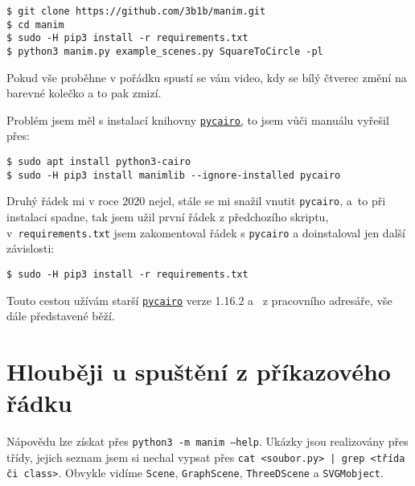 \begin{lstlisting}
$ git clone https://github.com/3b1b/manim.git
$ cd manim
$ sudo -H pip3 install -r requirements.txt
$ python3 manim.py example_scenes.py SquareToCircle -pl
\end{lstlisting}

\maldelka=21mm
\noindent
{}\hfill
{}\hfill
{}\hfill
{}\hfill
{}%


Pokud vše proběhne v pořádku spustí se vám video, kdy se bílý čtverec změní na barevné kolečko a to pak zmizí. 

Problém jsem měl s instalací knihovny 
\href{https://pypi.org/project/pycairo/}{\texttt{pycairo},} to jsem vůči manuálu vyřešil 
přes: 
\begin{lstlisting}
$ sudo apt install python3-cairo
$ sudo -H pip3 install manimlib --ignore-installed pycairo
\end{lstlisting}

Druhý řádek mi v roce 2020 nejel, stále se mi snažil vnutit \texttt{pycairo}, a~to při instalaci spadne, tak jsem užil první řádek z předchozího skriptu, v~\texttt{requirements.txt} jsem zakomentoval řádek s \texttt{pycairo} a doinstaloval jen další závislosti:
\begin{lstlisting}
$ sudo -H pip3 install -r requirements.txt 
\end{lstlisting}

Touto cestou užívám starší 
\href{https://pycairo.readthedocs.io/en/latest/}{\texttt{pycairo}} verze 1.16.2 a \Manim\ z pracovního adresáře, vše dále představené běží.



\section{Hlouběji u spuštění z příkazového řádku}

Nápovědu lze získat přes \texttt{python3 -m manim --help}. Ukázky jsou realizovány přes třídy, jejich seznam jsem si nechal vypsat přes \texttt{cat <soubor.py> | grep <třída či class>}. Obvykle vidíme 
{\tt Scene}, 
{\tt GraphScene}, 
{\tt ThreeDScene} a 
{\tt SVGMobject}.

